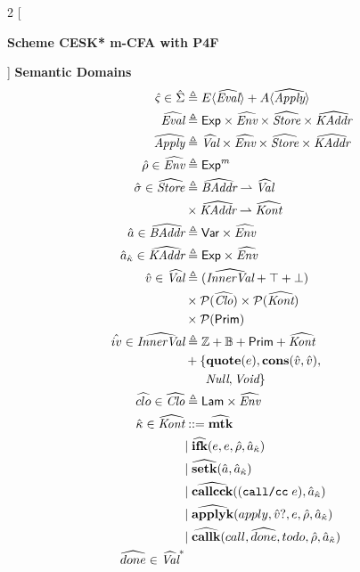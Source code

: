 \documentclass[12pt,draft]{article}
\newcommand{\callccsyn}[1]{(\texttt{call/cc}\;#1)}
\begin{document}
\begin{multicols*}{2}
  [
  \begin{center}
    \textbf{Scheme CESK* m-CFA with P4F}
  \end{center}
  ]
  \noindent\textbf{Semantic Domains}
  \begin{align*}
    \astate \in \aState &\triangleq E\langle \aEval \rangle
                          + A\langle \aApply \rangle \\
    \aEval &\triangleq \cExp \times \aEnv \times \aStore \times \aKAddr \\
    \aApply &\triangleq \aVal \times \aEnv \times \aStore \times \aKAddr \\
    \aenv \in \aEnv &\triangleq \cExp^m \\
    \astore \in \aStore &\triangleq \aBAddr \rightharpoonup \aVal \\
                        &\times \aKAddr \rightharpoonup \aKont \\
    \abaddr \in \aBAddr &\triangleq \cVar \times \aEnv \\
    \akaddr \in \aKAddr &\triangleq \cExp \times \aEnv \\
    \aval \in \aVal &\triangleq (\aIVal + \top + \bot) \\
                        & \times \mathcal{P}(\aClo)
                          \times \mathcal{P}(\aKont) \\
                        & \times \mathcal{P}(\cPrim) \\
    \aival \in \aIVal &\triangleq \mathbb{Z} + \mathbb{B} + \cPrim + \aKont \\
                        & + \{\textbf{quote}(e) , \textbf{cons}(\aval, \aval) , \\
                        &\;\;\;\;\;\; \cNull , \cVoid \} \\
    \aclo \in \aClo &\triangleq \cLam \times \aEnv \\
    \akont \in \aKont &::= \amtk \\
                        &|\; \aifk{e}{e}{\aenv}{\akaddr} \\
                        &|\; \asetk{\abaddr}{\akaddr} \\
                        &|\; \acallcck{\callccsyn{e}}{\akaddr} \\
                        &|\; \aapplyk{apply}{\aval?}{e}{\aenv}{\akaddr} \\
                        &|\; \acallk{call}{\adone}{todo}{\aenv}{\akaddr} \\
    \adone \in \aVal^*&

\end{align*}
\end{multicols*}
\end{document}
